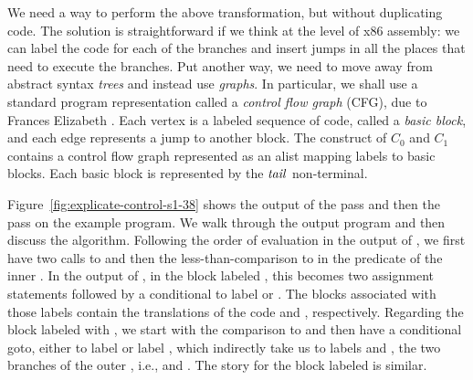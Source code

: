 \documentclass[11pt]{book}
\begin{document}
We need a way to perform the above transformation, but without
duplicating code. The solution is straightforward if we think at the
level of x86 assembly: we can label the code for each of the branches
and insert jumps in all the places that need to execute the
branches. Put another way, we need to move away from abstract syntax
\emph{trees} and instead use \emph{graphs}. In particular, we shall
use a standard program representation called a \emph{control flow
  graph} (CFG), due to Frances Elizabeth \citet{Allen:1970uq}.
Each vertex is a labeled sequence of code, called a \emph{basic block}, and
each edge represents a jump to another block. The 
construct of $C_0$ and $C_1$ contains a control flow graph represented
as an alist mapping labels to basic blocks. Each basic block is
represented by the $\mathit{tail}$ non-terminal.

Figure~\ref{fig:explicate-control-s1-38} shows the output of the
 pass and then the
 pass on the example program. We walk through
the output program and then discuss the algorithm.
%
Following the order of evaluation in the output of
, we first have two calls to 
and then the less-than-comparison to  in the predicate of the
inner .  In the output of , in the
block labeled , this becomes two assignment statements
followed by a conditional  to label  or
. The blocks associated with those labels contain the
translations of the code  and ,
respectively. Regarding the block labeled with , we
start with the comparison to  and then have a conditional
goto, either to label  or label , which
indirectly take us to labels  and , the
two branches of the outer , i.e.,  and . The story for the block labeled  is similar.
\end{document}
